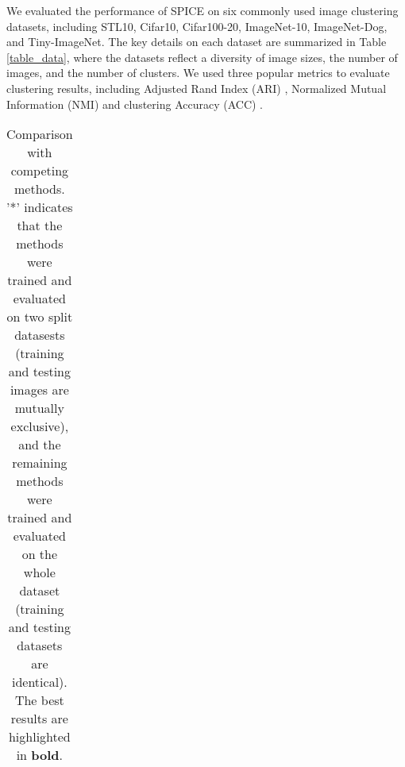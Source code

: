 \documentclass[10pt,twocolumn,letterpaper]{article}
\begin{document}
We evaluated the performance of SPICE on six commonly used image clustering datasets, including
STL10, Cifar10, Cifar100-20, ImageNet-10, ImageNet-Dog, and Tiny-ImageNet.
The key details on each dataset are summarized in Table \ref{table_data}, where the datasets reflect a diversity of image sizes, the number of images, and the number of clusters.
We used three popular metrics to evaluate clustering results, including Adjusted Rand Index (ARI) \cite{hubert1985comparing}, Normalized Mutual Information (NMI) \cite{strehl2002clusterensembles} and clustering Accuracy (ACC) \cite{LiD06}.


\begin{table*}[t]
\footnotesize
\renewcommand\tabcolsep{3.1pt}
\caption{ Comparison with competing methods. '*' indicates that the methods were trained and evaluated on two split datasests (training and testing images are mutually exclusive), and the remaining methods were trained and evaluated on the whole dataset  (training and testing datasets are identical). The best results are highlighted in \textbf{bold}.}
\label{table_results_compare}
\centering
\begin{tabular}{|c|ccc|ccc|ccc|ccc|ccc|ccc|}
\hline


\end{tabular}
\end{table*}
\end{document}
